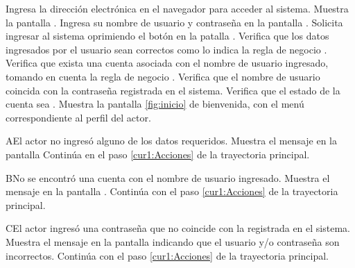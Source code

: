  \begin{UCtrayectoria}
    \UCpaso[\UCactor] Ingresa la dirección electrónica en el navegador para acceder al sistema.
    \UCpaso[\UCsist] Muestra la pantalla .
    \UCpaso[\UCactor] Ingresa su nombre de usuario y contraseña en la pantalla . \label{cur1:Acciones}
    \UCpaso[\UCactor] Solicita ingresar al sistema oprimiendo el botón  en la patalla .
    \UCpaso[\UCsist] Verifica que los datos ingresados por el usuario sean correctos como lo indica la regla de negocio . 
    \UCpaso[\UCsist] Verifica que exista una cuenta asociada con el nombre de usuario ingresado, tomando en cuenta la regla de negocio . 
    \UCpaso[\UCsist] Verifica que el nombre de usuario coincida con la contraseña registrada en el sistema. 
    \UCpaso[\UCsist] Verifica que el estado de la cuenta sea . 
    \UCpaso[\UCsist] Muestra la pantalla \ref{fig:inicio} de bienvenida, con el menú correspondiente al perfil del actor.
 \end{UCtrayectoria}

 \begin{UCtrayectoriaA}{A}{El actor no ingresó alguno de los datos requeridos.}
    \UCpaso[\UCsist] Muestra el mensaje  en la pantalla 
   \UCpaso[] Continúa en el paso \ref{cur1:Acciones} de la trayectoria principal.
 \end{UCtrayectoriaA}
 
 \begin{UCtrayectoriaA}{B}{No se encontró una cuenta con el nombre de usuario ingresado.}
    \UCpaso[\UCsist] Muestra el mensaje  en la pantalla .
    \UCpaso[] Continúa con el paso \ref{cur1:Acciones} de la trayectoria principal.
 \end{UCtrayectoriaA}
 
 \begin{UCtrayectoriaA}{C}{El actor ingresó una contraseña que no coincide con la registrada en el sistema.}
    \UCpaso[\UCsist] Muestra el mensaje  en la pantalla  indicando que el usuario y/o contraseña son incorrectos.
    \UCpaso[] Continúa con el paso \ref{cur1:Acciones} de la trayectoria principal.
 \end{UCtrayectoriaA} 

